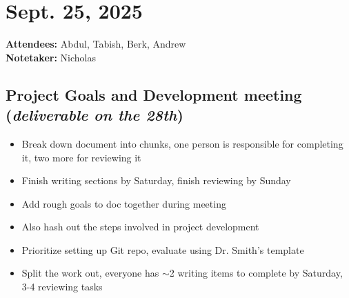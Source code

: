 	\pagebreak
	\section*{Sept. 25, 2025}

	\textbf{Attendees:} Abdul, Tabish, Berk, Andrew \\
	\textbf{Notetaker:} Nicholas

	\subsection*{Project Goals and Development meeting (\textit{deliverable on the 28th})}
		\begin{itemize}
			\item Break down document into chunks, one person is responsible for completing it, two more for reviewing it
			\item Finish writing sections by Saturday, finish reviewing by Sunday
			\item Add rough goals to doc together during meeting
			\item Also hash out the steps involved in project development
			\item Prioritize setting up Git repo, evaluate using Dr. Smith’s template
			\item Split the work out, everyone has $\sim$2 writing items to complete by Saturday, 3-4 reviewing tasks
		\end{itemize}


